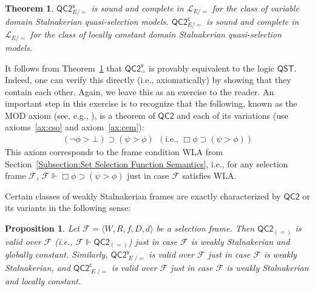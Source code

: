 \documentclass[12pt]{article}
\newtheorem{theorem}{Theorem}
\newtheorem{proposition}{Proposition}
\newcommand{\tup}[1]{\langle #1 \rangle}
\newcommand{\would}{\mathbin{>}}
\newcommand{\nec}{\mathop{\Box}}
\newcommand{\then}{\mathbin{\supset}}
\newcommand{\ex}{\mathop{\textit{E}}}
\begin{document}
\begin{theorem}
\label{thm:QC2v-comp}
    $\mathsf{QC2^v_{\textit{E}/=}}$ is sound and complete in $\mathcal{L}_{E/=}$ for the class of variable domain Stalnakerian quasi-selection models. 
    $\mathsf{QC2^c_{\textit{E}/=}}$ is sound and complete in $\mathcal{L}_{E/=}$ for the class of locally constant domain Stalnakerian quasi-selection models. 
\end{theorem}

It follows from Theorem~\ref{thm:QC2v-comp} that $\mathsf{QC2^v_=}$ is provably equivalent to the logic $\mathsf{QST}$. 
Indeed, one can verify this directly (i.e., axiomatically) by showing that they contain each other. 
Again, we leave this as an exercise to the reader. 
An important step in this exercise is to recognize that the following, known as the MOD axiom (see, e.g., \cite[p.~160]{Nute1980}), is a theorem of $\mathsf{QC2}$ and each of its variations (use axioms~\ref{ax:cso} and axiom~\ref{ax:cem}):
\begin{align*}
    (\neg\phi \would \bot) \then (\psi \would \phi) \ \ (\text{i.e., } \nec\phi \then (\psi \would \phi))
\end{align*}
This axiom corresponds to the frame condition WLA from Section~\ref{Subsection:Set Selection Function Semantics}, i.e., for any selection frame $\mathcal{F}$, $\mathcal{F} \Vdash \nec\phi \then (\psi \would \phi)$ just in case $\mathcal{F}$ satisfies WLA.


Certain classes of weakly Stalnakerian frames are exactly characterized by $\mathsf{QC2}$ or its variants in the following sense:

\begin{proposition}
\label{Proposition:FrameCorrespondence}
    Let $\mathcal{F} = \tup{W,R,f,D,d}$ be a selection frame. 
    Then $\mathsf{QC2_{(=)}}$ is valid over $\mathcal{F}$ (i.e., $\mathcal{F} \Vdash \mathsf{QC2_{(=)}}$) just in case $\mathcal{F}$ is weakly Stalnakerian and globally constant. 
    Similarly, $\mathsf{QC2^v_{\ex/=}}$ is valid over $\mathcal{F}$ just in case $\mathcal{F}$ is weakly Stalnakerian, and $\mathsf{QC2^c_{\ex/=}}$ is valid over $\mathcal{F}$ just in case $\mathcal{F}$ is weakly Stalnakerian and locally constant. 
\end{proposition}
\end{document}
